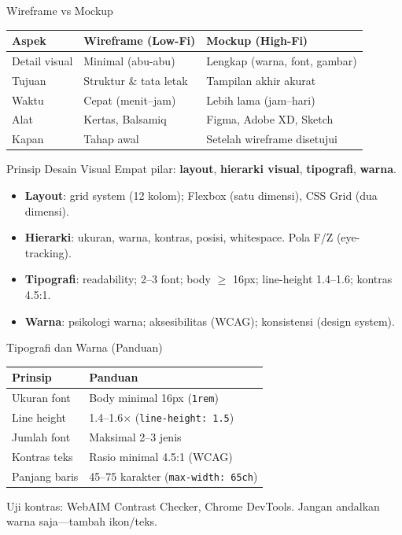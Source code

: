 \documentclass[handout]{beamer}
\begin{document}
\begin{frame}{Wireframe vs Mockup}
	\small
	\begin{tabular}{|l|l|l|}
		\hline
		\textbf{Aspek} & \textbf{Wireframe (Low-Fi)} & \textbf{Mockup (High-Fi)} \\
		\hline
		Detail visual & Minimal (abu-abu) & Lengkap (warna, font, gambar) \\
		\hline
		Tujuan & Struktur \& tata letak & Tampilan akhir akurat \\
		\hline
		Waktu & Cepat (menit--jam) & Lebih lama (jam--hari) \\
		\hline
		Alat & Kertas, Balsamiq & Figma, Adobe XD, Sketch \\
		\hline
		Kapan & Tahap awal & Setelah wireframe disetujui \\
		\hline
	\end{tabular}
\end{frame}

\begin{frame}{Prinsip Desain Visual}
	Empat pilar: \textbf{layout}, \textbf{hierarki visual}, \textbf{tipografi}, \textbf{warna}.
	\begin{itemize}
		\item \textbf{Layout}: grid system (12 kolom); Flexbox (satu dimensi), CSS Grid (dua dimensi).
		\item \textbf{Hierarki}: ukuran, warna, kontras, posisi, whitespace. Pola F/Z (eye-tracking).
		\item \textbf{Tipografi}: readability; 2--3 font; body $\geq$ 16px; line-height 1.4--1.6; kontras 4.5:1.
		\item \textbf{Warna}: psikologi warna; aksesibilitas (WCAG); konsistensi (design system).
	\end{itemize}
\end{frame}

\begin{frame}{Tipografi dan Warna (Panduan)}
	\small
	\begin{tabular}{|l|l|}
		\hline
		\textbf{Prinsip} & \textbf{Panduan} \\
		\hline
		Ukuran font & Body minimal 16px (\texttt{1rem}) \\
		\hline
		Line height & 1.4--1.6$\times$ (\texttt{line-height: 1.5}) \\
		\hline
		Jumlah font & Maksimal 2--3 jenis \\
		\hline
		Kontras teks & Rasio minimal 4.5:1 (WCAG) \\
		\hline
		Panjang baris & 45--75 karakter (\texttt{max-width: 65ch}) \\
		\hline
	\end{tabular}
	\vspace{0.5em}
	Uji kontras: WebAIM Contrast Checker, Chrome DevTools. Jangan andalkan warna saja---tambah ikon/teks.
\end{frame}
\end{document}

